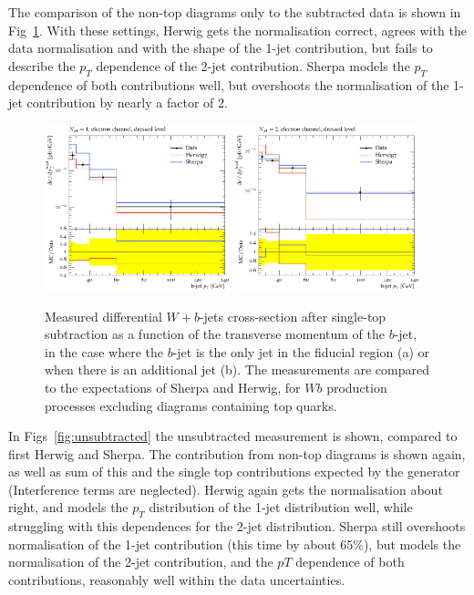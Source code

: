 \documentclass[11pt]{cernrep}
\begin{document}
The comparison of the non-top diagrams only to the subtracted data is shown in Fig~\ref{fig:subtracted}. 
With these settings, Herwig gets the normalisation correct, agrees with the data normalisation and with the shape of the 1-jet contribution, but fails to describe the $p_T$ 
dependence of the 2-jet contribution. Sherpa models the $p_T$ dependence of both contributions well, but overshoots the normalisation of the 1-jet contribution by nearly a 
factor of 2.

\begin{figure}
\centering
	\includegraphics[width=0.48\textwidth]{subtracted_h7_s22-1jet.pdf}
	\includegraphics[width=0.48\textwidth]{subtracted_h7_s22-2jet.pdf}
\caption{\label{fig:subtracted}
Measured differential $W+b$-jets cross-section after single-top subtraction as a function of the transverse momentum of the $b$-jet, in the case where the $b$-jet is the only jet in the fiducial region (a) or when there is an additional jet (b). The measurements are compared to the expectations of Sherpa and Herwig, for $Wb$ production processes excluding diagrams containing top quarks.}
\end{figure}

In Figs~\ref{fig:unsubtracted} the unsubtracted measurement is shown, compared to first Herwig and Sherpa. The contribution from non-top diagrams is shown again, as well as sum
of this and the single top contributions expected by the generator (Interference terms are neglected). Herwig again gets the normalisation about right, and models the $p_T$ 
distribution of the 1-jet distribution well, while struggling with this dependences for the 2-jet distribution. Sherpa still overshoots normalisation of the 1-jet contribution 
(this time by about 65\%), but models the normalisation of the 2-jet contribution, and the $pT$ dependence of both contributions, reasonably well within the data uncertainties.
\end{document}
